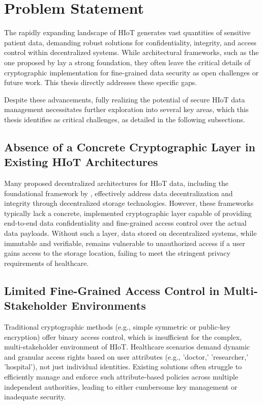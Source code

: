 \documentclass[cic,tc,english]{iiufrgs}
\numberwithin{algorithm}{chapter}
\begin{document}
    \section{Problem Statement}
        \label{sec:problemstatement}

        The rapidly expanding landscape of HIoT generates vast quantities of sensitive patient data, demanding robust solutions for confidentiality, integrity, and access control within decentralized systems. While architectural frameworks, such as the one proposed by \citet{laura2023} lay a strong foundation, they often leave the critical details of cryptographic implementation for fine-grained data security as open challenges or future work. This thesis directly addresses these specific gaps.

        Despite these advancements, fully realizing the potential of secure HIoT data management necessitates further exploration into several key areas, which this thesis identifies as critical challenges, as detailed in the following subsections.

        \subsection{Absence of a Concrete Cryptographic Layer in Existing HIoT Architectures}
            Many proposed decentralized architectures for HIoT data, including the foundational framework by \citet{laura2023}, effectively address data decentralization and integrity through decentralized storage technologies. However, these frameworks typically lack a concrete, implemented cryptographic layer capable of providing end-to-end data confidentiality and fine-grained access control over the actual data payloads. Without such a layer, data stored on decentralized systems, while immutable and verifiable, remains vulnerable to unauthorized access if a user gains access to the storage location, failing to meet the stringent privacy requirements of healthcare.

        \subsection{Limited Fine-Grained Access Control in Multi-Stakeholder Environments}
            Traditional cryptographic methods (e.g., simple symmetric or public-key encryption) offer binary access control, which is insufficient for the complex, multi-stakeholder environment of HIoT. Healthcare scenarios demand dynamic and granular access rights based on user attributes (e.g., 'doctor,' 'researcher,' 'hospital'), not just individual identities. Existing solutions often struggle to efficiently manage and enforce such attribute-based policies across multiple independent authorities, leading to either cumbersome key management or inadequate security.
\end{document}

